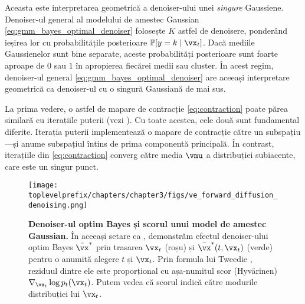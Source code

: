 \documentclass[../../book-main_ro.tex]{subfiles}
\begin{document}
\begin{example}
	Aceasta este interpretarea geometrică a denoiser-ului unei \textit{singure} Gaussiene. Denoiser-ul general al modelului de amestec Gaussian \eqref{eq:gmm_bayes_optimal_denoiser} folosește \(K\) astfel de denoisere, ponderând ieșirea lor cu probabilitățile posterioare \(\Pr[y = k \mid \vx_{t}]\). Dacă mediile Gaussienelor sunt bine separate, aceste probabilități posterioare sunt foarte aproape de \(0\) sau \(1\) în apropierea fiecărei medii sau cluster. În acest regim, denoiser-ul general \eqref{eq:gmm_bayes_optimal_denoiser} are aceeași interpretare geometrică ca denoiser-ul cu o singură Gaussiană de mai sus.

	La prima vedere, o astfel de mapare de contracție \eqref{eq:contraction} poate părea similară cu iterațiile puterii (vezi ). Cu toate acestea, cele două sunt fundamental diferite. Iterația puterii implementează o mapare de contracție către un subspațiu---și anume subspațiul întins de prima componentă principală. În contrast, iterațiile din \eqref{eq:contraction} converg către media \(\vmu\) a distribuției subiacente, care este un singur punct.
\end{example}

\begin{figure}
	\centering 
	\texttt{[image: \\toplevelprefix/chapters/chapter3/figs/ve\_forward\_diffusion\_denoising.png]}\vspace{-0.15in}
	\caption{\small \textbf{Denoiser-ul optim Bayes și scorul unui model de amestec Gaussian.} În aceeași setare ca , demonstrăm efectul denoiser-ului optim Bayes \(\bar{\vx}^{\ast}\) prin trasarea \(\vx_{t}\) (roșu) și \(\bar{\vx}^{\ast}(t, \vx_{t})\) (verde) pentru o anumită alegere \(t\) și \(\vx_{t}\). Prin formula lui Tweedie , reziduul dintre ele este proporțional cu așa-numitul scor (Hyv\"arinen) \(\nabla_{\vx_{t}}\log p_{t}(\vx_{t})\). Putem vedea că scorul indică către modurile distribuției lui \(\vx_{t}\).}
	\label{fig:ve_forward_denoising}
\end{figure}
\end{document}
